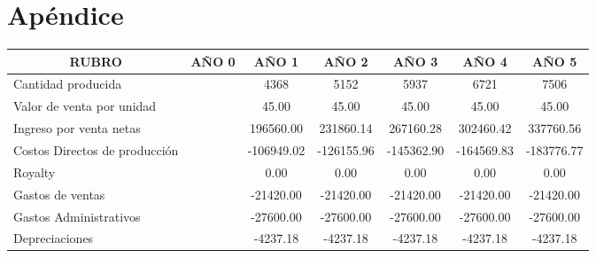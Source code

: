 \documentclass[a4paper,openright,12pt]{book}
\begin{document}

\cleardoublepage
{}



\appendix
\chapter{Apéndice}\label{aped.A}

\begin{table}[H]
\resizebox{18cm}{!} {
\begin{tabular}{lcccccc}
\hline
\multicolumn{1}{c}{\textbf{RUBRO}}    & \textbf{AÑO 0}     & \textbf{AÑO 1}    & \textbf{AÑO 2}    & \textbf{AÑO 3}    & \textbf{AÑO 4}    & \textbf{AÑO 5}     \\
\hline
Cantidad producida                    &                    & 4368              & 5152              & 5937              & 6721              & 7506               \\
Valor de venta por unidad             &                    & 45.00             & 45.00             & 45.00             & 45.00             & 45.00              \\
Ingreso por venta netas               &                    & 196560.00         & 231860.14         & 267160.28         & 302460.42         & 337760.56          \\
Costos Directos de producción         &                    & -106949.02        & -126155.96        & -145362.90        & -164569.83        & -183776.77         \\
Royalty                               &                    & 0.00              & 0.00              & 0.00              & 0.00              & 0.00               \\
Gastos de ventas                      &                    & -21420.00         & -21420.00         & -21420.00         & -21420.00         & -21420.00          \\
Gastos Administrativos                &                    & -27600.00         & -27600.00         & -27600.00         & -27600.00         & -27600.00          \\
Depreciaciones                        &                    & -4237.18          & -4237.18          & -4237.18          & -4237.18          & -4237.18           \\

\end{tabular}}
\end{table}
\end{document}
